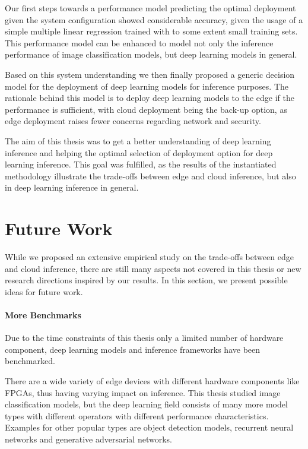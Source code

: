 Our first steps towards a performance model predicting the optimal deployment given the system configuration showed considerable accuracy, given the usage of a simple multiple linear regression trained with to some extent small training sets.
This performance model can be enhanced to model not only the inference performance of image classification models, but deep learning models in general.

Based on this system understanding we then finally proposed a generic decision model for the deployment of deep learning models for inference purposes. The rationale behind this model is to deploy deep learning models to the edge if the performance is sufficient, with cloud deployment being the back-up option, as edge deployment raises fewer concerns regarding network and security.


The aim of this thesis was to get a better understanding of deep learning inference and helping the optimal selection of deployment option for deep learning inference.
This goal was fulfilled, as the results of the instantiated methodology illustrate the trade-offs between edge and cloud inference, but also in deep learning inference in general.




\section{Future Work}
While we proposed an extensive empirical study on the trade-offs between edge and cloud inference, there are still many aspects not covered in this thesis or new research directions inspired by our results. 
In this section, we present possible ideas for future work.

\paragraph{More Benchmarks}
Due to the time constraints of this thesis only a limited number of hardware component, deep learning models and inference frameworks have been benchmarked.

There are a wide variety of edge devices with different hardware components like FPGAs, thus having varying impact on inference.
This thesis studied image classification models, but the deep learning field consists of many more model types with different operators with different performance characteristics.
Examples for other popular types are object detection models, recurrent neural networks and generative adversarial networks.

